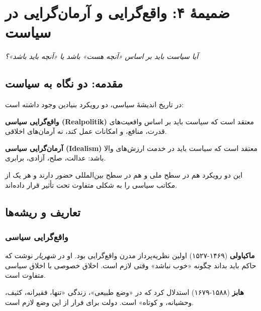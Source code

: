 \chapter*{ضمیمهٔ ۴: واقع‌گرایی و آرمان‌گرایی در سیاست}

\begin{tcolorbox}[
    enhanced,
    colback=lightbg,
    colframe=darkgray,
    boxrule=2pt,
    arc=8pt,
    fonttitle=\bfseries\large,
    title={\rl{پرسش محوری}}
]
\begin{center}
\Large\textit{آیا سیاست باید بر اساس «آنچه هست» باشد یا «آنچه باید باشد»؟}
\end{center}
\end{tcolorbox}

\section*{مقدمه: دو نگاه به سیاست}

در تاریخ اندیشهٔ سیاسی، دو رویکرد بنیادین وجود داشته است:

\textbf{واقع‌گرایی سیاسی (Realpolitik)} معتقد است که سیاست باید بر اساس واقعیت‌های قدرت، منافع، و امکانات عمل کند، نه آرمان‌های اخلاقی.

\textbf{آرمان‌گرایی سیاسی (Idealism)} معتقد است که سیاست باید در خدمت ارزش‌های والا باشد: عدالت، صلح، آزادی، برابری.

این دو رویکرد هم در سطح ملی و هم در سطح بین‌المللی حضور دارند و هر یک از مکاتب سیاسی را به شکلی متفاوت تحت تأثیر قرار داده‌اند.

\section{تعاریف و ریشه‌ها}

\subsection{واقع‌گرایی سیاسی}

\textbf{ماکیاولی} (۱۴۶۹-۱۵۲۷) اولین نظریه‌پرداز مدرن واقع‌گرایی بود. او در \textit{شهریار} نوشت که حاکم باید بداند چگونه «خوب نباشد» وقتی لازم است. اخلاق خصوصی با اخلاق سیاسی متفاوت است.

\textbf{هابز} (۱۵۸۸-۱۶۷۹) استدلال کرد که در «وضع طبیعی»، زندگی «تنها، فقیرانه، کثیف، وحشیانه، و کوتاه» است. دولت برای فرار از این وضع لازم است.

